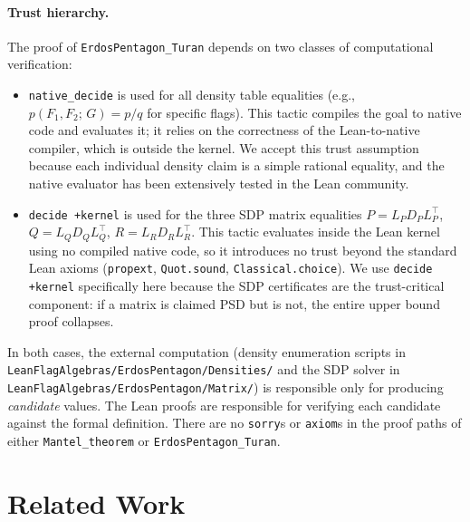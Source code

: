 \documentclass{article}
\newcommand{\den}[2]{p(#1;\,#2)}
\newcommand{\lean}[1]{\texttt{#1}}
\begin{document}
\paragraph{Trust hierarchy.}
The proof of \lean{ErdosPentagon\_Turan} depends on two classes of
computational verification:
\begin{itemize}
  \item \lean{native\_decide} is used for all density table equalities
    (e.g., $\den{F_1,F_2}{G} = p/q$ for specific flags).  This tactic
    compiles the goal to native code and evaluates it; it relies on the
    correctness of the Lean-to-native compiler, which is outside the kernel.
    We accept this trust assumption because each individual density claim is
    a simple rational equality, and the native evaluator has been extensively
    tested in the Lean community.

  \item \lean{decide +kernel} is used for the three SDP matrix equalities
    $P = L_P D_P L_P^\top$, $Q = L_Q D_Q L_Q^\top$, $R = L_R D_R L_R^\top$.
    This tactic evaluates inside the Lean kernel using no compiled native
    code, so it introduces no trust beyond the standard Lean axioms
    (\lean{propext}, \lean{Quot.sound}, \lean{Classical.choice}).
    We use \lean{decide +kernel} specifically here because the SDP
    certificates are the trust-critical component: if a matrix is claimed PSD
    but is not, the entire upper bound proof collapses.
\end{itemize}
In both cases, the external computation (density enumeration scripts
in \lean{LeanFlagAlgebras/ErdosPentagon/Densities/} and the SDP solver in
\lean{LeanFlagAlgebras/ErdosPentagon/Matrix/}) is responsible only for
producing \emph{candidate} values.  The Lean proofs are responsible for
verifying each candidate against the formal definition.  There are no
\lean{sorry}s or \lean{axiom}s in the proof paths of either
\lean{Mantel\_theorem} or \lean{ErdosPentagon\_Turan}.


\section{Related Work}
\label{sec:related}
\end{document}
